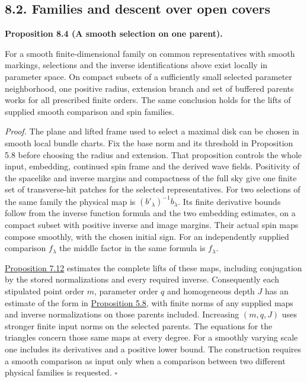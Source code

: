 \documentclass[
  english,
  11pt,
  reqno]{amsart}
\makeatletter
\newcommand{\pandocstatementheading}[1]{%
  \par\addpenalty{\@beginparpenalty}%
  \addvspace{.5\baselineskip plus .2\baselineskip minus .2\baselineskip}%
  {\normalfont\bfseries #1\par}%
  \nobreak\@afterindenttrue\@afterheading
}
\makeatother
\begin{document}
\subsection{8.2. Families and descent over open
covers}\label{families-and-descent-over-open-covers}\label{sec:families-and-descent}

\pandocstatementheading{\leavevmode{}\label{prop:local-inverse-families}Proposition 8.4 (A smooth selection on one parent).}

For a smooth finite-dimensional family on common representatives with
smooth markings, selections and the inverse identifications above exist
locally in parameter space. On compact subsets of a sufficiently small
selected parameter neighborhood, one positive radius, extension branch
and set of buffered parents works for all prescribed finite orders. The
same conclusion holds for the lifts of supplied smooth comparison and
spin families.

\emph{Proof.} The plane and lifted frame used to select a maximal disk
can be chosen in smooth local bundle charts. Fix the base norm and its
threshold in Proposition 5.8 before choosing the radius and extension.
That proposition controls the whole input, embedding, continued spin
frame and the derived wave fields. Positivity of the spacelike and
inverse margins and compactness of the full sky give one finite set of
transverse-hit patches for the selected representatives. For two
selections of the same family the physical map is
\((b'_\lambda)^{-1}b_\lambda\). Its finite derivative bounds follow from
the inverse function formula and the two embedding estimates, on a
compact subset with positive inverse and image margins. Their actual
spin maps compose smoothly, with the chosen initial sign. For an
independently supplied comparison \(f_\lambda\) the middle factor in the
same formula is \(f_\lambda\).

\hyperref[prop:online-full-comparison-finite-families]{Proposition 7.12}
estimates the complete lifts of these maps, including conjugation by the
stored normalizations and every required inverse. Consequently each
stipulated point order \(m\), parameter order \(q\) and homogeneous
depth \(J\) has an estimate of the form in
\hyperref[prop:submission-coverage-family-estimates]{Proposition 5.8},
with finite norms of any supplied maps and inverse normalizations on
those parents included. Increasing \((m,q,J)\) uses stronger finite
input norms on the selected parents. The equations for the triangles
concern those same maps at every degree. For a smoothly varying scale
one includes its derivatives and a positive lower bound. The
construction requires a smooth comparison as input only when a
comparison between two different physical families is requested.
\hfill\(\square\)
\end{document}
